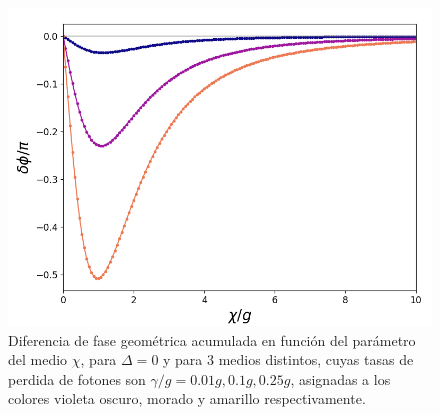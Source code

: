 \begin{figure}[h]
    \begin{minipage}[c]{0.67\textwidth}
        \includegraphics[width=\textwidth]{figuras/ch3/robustez kerr.png}
    \end{minipage}\hfill
    \begin{minipage}[c]{0.3\textwidth}
    \caption{Diferencia de fase geométrica acumulada en función del parámetro del medio $\chi$, para $\Delta=0$ y para 3 medios distintos, cuyas tasas de perdida de fotones son $\gamma/g=0.01g,0.1g,0.25g$, asignadas a los colores violeta oscuro, morado y amarillo respectivamente.}
    \label{fig3:robustez kerr}
  \end{minipage}
\end{figure}

